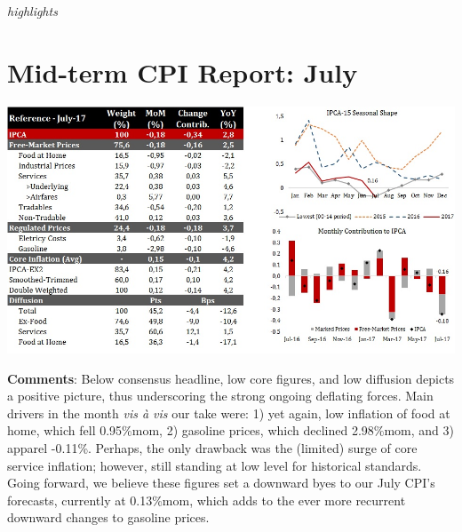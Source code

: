 \documentclass{report}
\date{}
\title{}
\begin{document}
\thispagestyle{firstpagestyle}
\JournalIssue
    \begin{tcolorbox}[colbak=red!5!white, colframe=red!0!white]
     \it{{highlights}}
    \end{tcolorbox}
\vspace{-0.5cm}

\section{Mid-term CPI Report: July}
\label{sec:org784894a}


\begin{center}
\includegraphics[width=16.0cm]{images/First_page.jpg}
\end{center}



\textbf{Comments}: Below consensus headline, low core figures, and low
diffusion depicts a positive picture, thus underscoring the strong ongoing
deflating forces. Main drivers in the month \emph{vis à vis} our take
were: 1) yet again, low inflation of food at home, which fell
0.95\%mom, 2) gasoline prices, which declined 2.98\%mom, and 3) apparel
-0.11\%. Perhaps, the only drawback was the (limited) surge of core
service inflation; however, still standing at low level for historical
standards. Going forward, we believe these figures set a downward byes
to our July CPI's forecasts, currently at 0.13\%mom, which adds to the
ever more recurrent downward changes to gasoline prices.
\end{document}
